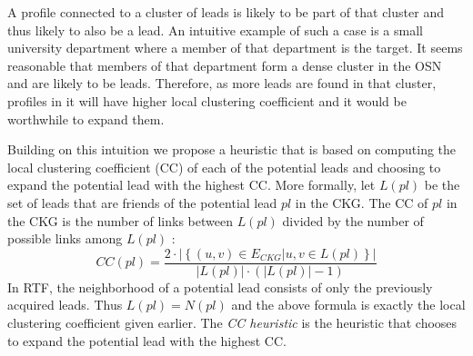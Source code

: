 \documentclass[prodmode,acmtecs]{acmsmall} %
\newcommand{\note}[2]{\textbf{\textsc{#1} says: \textit{#2}}}
\begin{document}


A profile connected to a cluster of leads is likely to be part of that cluster and thus likely to also be a lead. 
An intuitive example of such a case is a small university department where a member of that department is the target. It seems reasonable that members of that department form a dense cluster in the OSN and are likely to be leads. Therefore, as more leads are found in that cluster, profiles in it will have higher local clustering coefficient and it would be worthwhile to expand them.


Building on this intuition we propose a heuristic that is based on computing the local clustering coefficient (CC) of each of the potential leads and choosing to expand the potential lead with the highest CC. 
More formally, let $L(pl)$ be the set of leads that are friends of the potential lead $pl$ in the CKG. The CC of $pl$ in the CKG is the number of links between $L(pl)$ divided by the number of possible links among $L(pl)$ :
\begin{equation}
CC(pl)=\frac{2\cdot\left|\left\{(u,v)\in E_{CKG} | u,v\in L(pl)\right\}\right|}{|L(pl)|\cdot(|L(pl)|-1)}
\end{equation}
In RTF, the neighborhood of a potential lead consists of only the previously acquired leads. Thus $L(pl)=N(pl)$ and the above formula is exactly the local clustering coefficient given earlier. The {\em CC heuristic} is the heuristic that chooses to expand the potential lead with the highest CC. 
\end{document}
